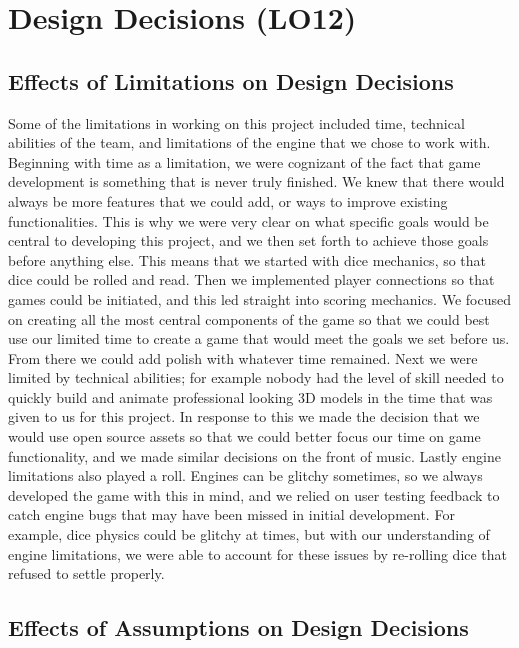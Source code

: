 \documentclass{article}
\begin{document}
\section{Design Decisions (LO12)}


\subsection{Effects of Limitations on Design Decisions}

Some of the limitations in working on this project included time, technical abilities of the team, and limitations of the engine that we chose to work with. Beginning with time as a limitation, we were cognizant of the fact that game development is something that is never truly finished. We knew that there would always be more features that we could add, or ways to improve existing functionalities. This is why we were very clear on what specific goals would be central to developing this project, and we then set forth to achieve those goals before anything else. This means that we started with dice mechanics, so that dice could be rolled and read. Then we implemented player connections so that games could be initiated, and this led straight into scoring mechanics. We focused on creating all the most central components of the game so that we could best use our limited time to create a game that would meet the goals we set before us. From there we could add polish with whatever time remained. Next we were limited by technical abilities; for example nobody had the level of skill needed to quickly build and animate professional looking 3D models in the time that was given to us for this project. In response to this we made the decision that we would use open source assets so that we could better focus our time on game functionality, and we made similar decisions on the front of music. Lastly engine limitations also played a roll. Engines can be glitchy sometimes, so we always developed the game with this in mind, and we relied on user testing feedback to catch engine bugs that may have been missed in initial development. For example, dice physics could be glitchy at times, but with our understanding of engine limitations, we were able to account for these issues by re-rolling dice that refused to settle properly.

\subsection{Effects of Assumptions on Design Decisions}
\end{document}
